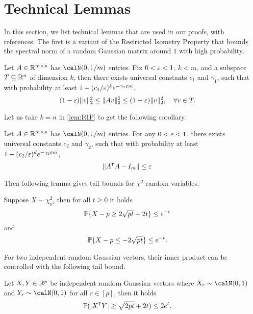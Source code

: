 \section{Technical Lemmas}

In this section, we list technical lemmas that are used in our proofs, 
with references. 
The first is a variant of the Restricted Isometry Property that bounds the spectral norm of a random Gaussian matrix around $1$ with high probability.

\begin{lemma}\label{lem:RIP}
    Let $A\in {\mathbb{R}^{m\times n}}$ has \iid $\calN(0,1/m)$ entries. Fix $0<\varepsilon<1$, $k < m$, and a subspace $T\subseteq \mathbb{R}^n$ of dimension $k$, then there exists universal constants $c_1$ and $\gamma_1$, such that with probability at least $1-(c_1/\varepsilon)^k e^{-\gamma_1\varepsilon m}$,
    \begin{align*}
    (1-\eps)\|v\|^2_2 \leq \|Av\|^2_2 \leq (1+\eps)\|v\|^2_2, \quad \forall v\in T.
    \end{align*}
\end{lemma}
Let us take $k = n$ in \cref{lem:RIP} to get the following corollary.
\begin{corollary}\label{cor:RIP}
    Let $A\in {\mathbb{R}^{m\times n}}$ has \iid $\calN(0,1/m)$ entries. For any $0<\varepsilon<1$, there exists universal constants $c_2$ and $\gamma_2$, such that with probability at least $1-(c_2/\varepsilon)^d e^{-\gamma_2\varepsilon m}$,
    \begin{align*}
        \|A\transpose A - I_m\|\leq \eps
    \end{align*}
\end{corollary}

Then following lemma gives tail bounds for $\chi^2$ random variables.
\begin{lemma}\label{lem:chi-squared-tail}
    Suppose $X\sim \chi^2_p$, then for all $t\geq 0$ it holds
    \begin{align*}
        \prob\{X-p \geq 2\sqrt{pt} + 2t\} \leq e^{-t}
    \end{align*}
    and
    \begin{align*}
        \prob\{X-p \leq -2\sqrt{pt}\} \leq e^{-t}.
    \end{align*}
\end{lemma}

For two independent random Gaussian vectors, their inner product can be controlled with the following tail bound.
\begin{lemma}\label{lem:inner-product-tail}
    Let $X,Y\in{\mathbb{R}^{p}}$ be independent random Gaussian vectors where $X_r\sim\calN(0,1)$ and $Y_r\sim\calN(0,1)$ for all $r\in[p]$, then it holds
    \begin{align*}
        \prob(|X\transpose Y| \geq \sqrt{2pt} + 2t) \leq 2e^t.
    \end{align*}
\end{lemma}
